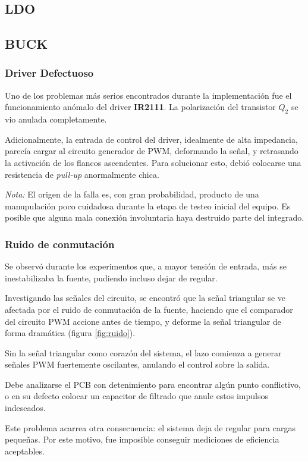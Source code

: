 \documentclass[]{article}
\begin{document}
	\subsection{LDO}
	
	\subsection{BUCK}
	\subsubsection{Driver Defectuoso}
	Uno de los problemas más serios encontrados durante la implementación fue el funcionamiento anómalo del driver \textbf{IR2111}. La polarización del transistor $Q_2$ se vio anulada completamente.
	
	Adicionalmente, la entrada de control del driver, idealmente de alta impedancia, parecía cargar al circuito generador de PWM, deformando la señal, y retrasando la activación de los flancos ascendentes. Para solucionar esto, debió colocarse una resistencia de \textit{pull-up} anormalmente chica.
	
	\textit{Nota:} El origen de la falla es, con gran probabilidad, producto de una manupulación poco cuidadosa durante la etapa de testeo inicial del equipo. Es posible que alguna mala conexión involuntaria haya destruido parte del integrado. 
	
	\subsubsection{Ruido de conmutación} \label{sec:ruido}
	Se observó durante los experimentos que, a mayor tensión de entrada, más se inestabilizaba la fuente, pudiendo incluso dejar de regular.
	
	Investigando las señales del circuito, se encontró que la señal triangular se ve afectada por el ruido de conmutación de la fuente, haciendo que el comparador del circuito PWM accione antes de tiempo, y deforme la señal triangular de forma dramática (figura \ref{fig:ruido}).
	
	Sin la señal triangular como corazón del sistema, el lazo comienza a generar señales PWM fuertemente oscilantes, anulando el control sobre la salida.
	
	Debe analizarse el PCB con detenimiento para encontrar algún punto conflictivo, o en su defecto colocar un capacitor de filtrado que anule estos impulsos indeseados.
	
	Este problema acarrea otra consecuencia: el sistema deja de regular para cargas pequeñas. Por este motivo, fue imposible conseguir mediciones de eficiencia aceptables.
	
\end{document}
